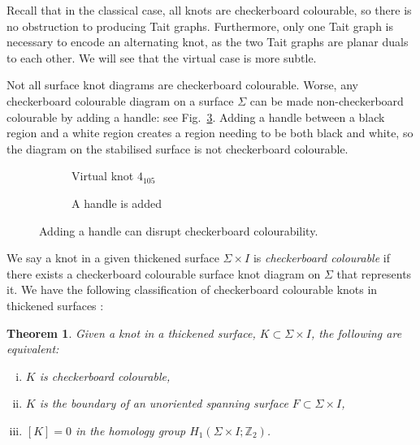 \documentclass[12pt]{report}
\newcommand{\Z}{\mathbb{Z}}
\newtheorem*{theorem}{Theorem}
\theoremstyle{upright}
\begin{document}
Recall that in the classical case, all knots are checkerboard colourable, so there is no obstruction to producing Tait graphs. Furthermore, only one Tait graph is necessary to encode an alternating knot, as the two Tait graphs are planar duals to each other. We will see that the virtual case is more subtle.

Not all surface knot diagrams are checkerboard colourable. Worse, any checkerboard colourable diagram on a surface $\Sigma$ can be made non-checkerboard colourable by adding a handle: see Fig.~\ref{fig:adding-handle-to-4-105}. Adding a handle between a black region and a white region creates a region needing to be both black and white, so the diagram on the stabilised surface is not checkerboard colourable.

\begin{figure}[hbt]
	\centering
	\hspace*{\fill}
	\begin{subfigure}[b]{0.4 \textwidth}
		\centering
		\def\svgscale{0.35}
		
		\caption{Virtual knot $4_{105}$}
		\label{fig:4-105-vknot}
	\end{subfigure}
	\hspace*{\fill}	\hspace*{\fill}	\hspace*{\fill}
	\begin{subfigure}[b]{0.4 \textwidth}
		\centering
		\def\svgscale{0.35}
		
		\caption{A handle is added}
		\label{fig:4-105-vknot-with-handle}
	\end{subfigure}
	\hspace*{\fill} 
	\caption{Adding a handle can disrupt checkerboard colourability.}
	\label{fig:adding-handle-to-4-105}
\end{figure}

We say a knot in a given thickened surface $\Sigma \times I$ is \textit{checkerboard colourable} if there exists a checkerboard colourable surface knot diagram on $\Sigma$ that represents it. We have the following classification of checkerboard colourable knots in thickened surfaces \cite{minimal-diagrams-surface-links}:

\begin{theorem}
Given a knot in a thickened surface, $K \subset \Sigma \times I$, the following are equivalent:
	\begin{enumerate}[(i)]
	\item $K$ is checkerboard colourable,
	\item $K$ is the boundary of an unoriented spanning surface $F \subset \Sigma \times I$,
	\item $[K] = 0$ in the homology group $H_{1}(\Sigma \times I; \Z_{2})$.
	\end{enumerate} 
\end{theorem}
\end{document}
